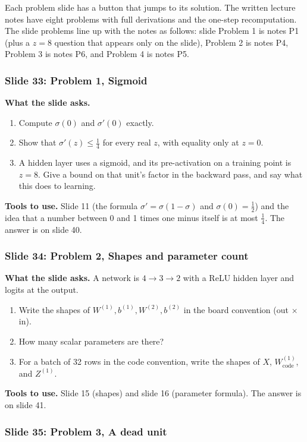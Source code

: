 Each problem slide has a button that jumps to its solution. The written lecture notes have eight problems with full derivations and the one-step recomputation. The slide problems line up with the notes as follows: slide Problem 1 is notes P1 (plus a $z=8$ question that appears only on the slide), Problem 2 is notes P4, Problem 3 is notes P6, and Problem 4 is notes P5.

\subsubsection{Slide 33: Problem 1, Sigmoid}

\textbf{What the slide asks.}
\begin{enumerate}
\item Compute $\sigma(0)$ and $\sigma'(0)$ exactly.
\item Show that $\sigma'(z)\le\tfrac14$ for every real $z$, with equality only at $z=0$.
\item A hidden layer uses a sigmoid, and its pre-activation on a training point is $z=8$. Give a bound on that unit's factor in the backward pass, and say what this does to learning.
\end{enumerate}
\textbf{Tools to use.} Slide 11 (the formula $\sigma'=\sigma(1-\sigma)$ and $\sigma(0)=\tfrac12$) and the idea that a number between 0 and 1 times one minus itself is at most $\tfrac14$. The answer is on slide 40.

\subsubsection{Slide 34: Problem 2, Shapes and parameter count}

\textbf{What the slide asks.} A network is $4\to3\to2$ with a ReLU hidden layer and logits at the output.
\begin{enumerate}
\item Write the shapes of $W^{(1)},b^{(1)},W^{(2)},b^{(2)}$ in the board convention (out $\times$ in).
\item How many scalar parameters are there?
\item For a batch of 32 rows in the code convention, write the shapes of $X$, $W^{(1)}_{\text{code}}$, and $Z^{(1)}$.
\end{enumerate}
\textbf{Tools to use.} Slide 15 (shapes) and slide 16 (parameter formula). The answer is on slide 41.

\subsubsection{Slide 35: Problem 3, A dead unit}

